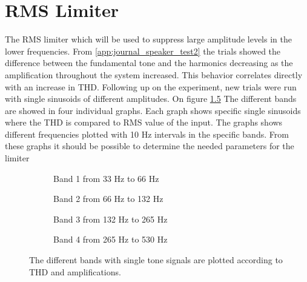\chapter{RMS Limiter}\label{cha:CompressorDesign}
The RMS limiter which will be used to suppress large amplitude levels in the lower frequencies. 
From \autoref{app:journal_speaker_test2} the trials showed the difference between the fundamental tone and the harmonics decreasing as the amplification throughout the system increased. This behavior correlates directly with an increase in THD.   Following up on the experiment, new trials were run with single sinusoids of different amplitudes. On figure \ref{fig:THDComparissonRMS} The different bands are showed in four individual graphs. Each graph shows specific single sinusoids where the THD is compared to RMS value of the input. The graphs shows different frequencies plotted with 10 Hz intervals in the specific bands. From these graphs it should be possible to determine the needed parameters for the limiter

\begin{figure}[H]
	\centering
	\begin{subfigure}[t]{0.45\textwidth}
		\centering
		
		\caption{Band 1 from 33 Hz to 66 Hz}
		\label{fig:Band1ModelRMS}
	\end{subfigure}
	\begin{subfigure}[t]{0.45\textwidth}
		\centering
		
		\caption{Band 2 from 66 Hz to 132 Hz}
		\label{fig:Band2ModelRMS}
	\end{subfigure}
	\begin{subfigure}[t]{0.45\textwidth}
		\centering
		
		\caption{Band 3 from 132 Hz to 265 Hz}
		\label{fig:Band3ModelRMS}
	\end{subfigure}
	\begin{subfigure}[t]{0.45\textwidth}
		\centering
		
		\caption{Band 4 from 265 Hz to 530 Hz}
		\label{fig:Band4ModelRMS}
	\end{subfigure}
	\caption{The different bands with single tone signals are plotted according to THD and amplifications.}
	\label{fig:THDComparissonRMS}
\end{figure} 

